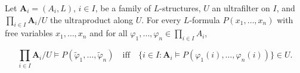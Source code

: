 Let $\mathbf{A}_i = (A_i, L)$, $i \in I$, be a family of $L$-structures, $U$ an ultrafilter on $I$, and $\prod_{i \in I} \mathbf{A}_i / U$ the ultraproduct along $U$. For every $L$-formula $P(x_1, \ldots, x_n)$ with free variables $x_1, \ldots, x_n$ and for all $\varphi_1, \ldots, \varphi_n \in \prod_{i \in I} A_i$,

$$\prod_{i \in I} \mathbf{A}_i / U \models P(\tilde{\varphi}_1, \ldots, \tilde{\varphi}_n) \quad \text{iff} \quad \{i \in I : \mathbf{A}_i \models P(\varphi_1(i), \ldots, \varphi_n(i))\} \in U.$$
